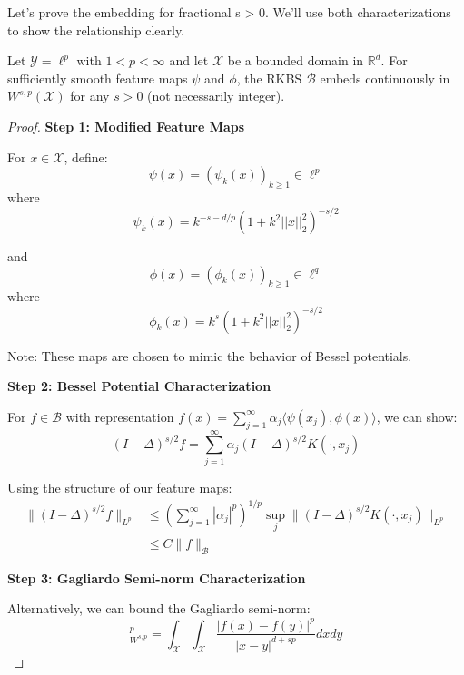 Let's prove the embedding for fractional s > 0. We'll use both characterizations to show the relationship clearly.

\begin{theorem}
Let $\mathcal{Y} = \ell^p$ with $1 < p < \infty$ and let $\mathcal{X}$ be a bounded domain in $\mathbb{R}^d$. For sufficiently smooth feature maps $\psi$ and $\phi$, the RKBS $\mathcal{B}$ embeds continuously in $W^{s,p}(\mathcal{X})$ for any $s > 0$ (not necessarily integer).
\end{theorem}

\begin{proof}
\textbf{Step 1: Modified Feature Maps}

For $x \in \mathcal{X}$, define:
\begin{equation}
\psi(x) = (\psi_k(x))_{k\ge 1} \in \ell^p
\end{equation}
where
\begin{equation}
\psi_k(x) = k^{-s-d/p}(1 + k^2||x||_2^2)^{-s/2}
\end{equation}

and
\begin{equation}
\phi(x) = (\phi_k(x))_{k\ge 1} \in \ell^q
\end{equation}
where
\begin{equation}
\phi_k(x) = k^{s}(1 + k^2||x||_2^2)^{-s/2}
\end{equation}

Note: These maps are chosen to mimic the behavior of Bessel potentials.

\textbf{Step 2: Bessel Potential Characterization}

For $f \in \mathcal{B}$ with representation $f(x) = \sum_{j=1}^\infty \alpha_j \langle \psi(x_j), \phi(x)\rangle$, we can show:
\begin{equation}
(I-\Delta)^{s/2}f = \sum_{j=1}^\infty \alpha_j (I-\Delta)^{s/2}K(\cdot,x_j)
\end{equation}

Using the structure of our feature maps:
\begin{align}
\|(I-\Delta)^{s/2}f\|_{L^p} &\leq \left(\sum_{j=1}^\infty |\alpha_j|^p\right)^{1/p} \sup_{j} \|(I-\Delta)^{s/2}K(\cdot,x_j)\|_{L^p} \\
&\leq C\|f\|_{\mathcal{B}}
\end{align}

\textbf{Step 3: Gagliardo Semi-norm Characterization}

Alternatively, we can bound the Gagliardo semi-norm:
\begin{equation}
[f]_{W^{s,p}}^p = \int_{\mathcal{X}}\int_{\mathcal{X}} \frac{|f(x)-f(y)|^p}{|x-y|^{d+sp}} dx dy
\end{equation}


\end{proof}
